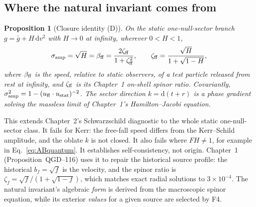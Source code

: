 \documentclass[11pt,a4paper]{article}
\newtheorem{proposition}[theorem]{Proposition}
\begin{document}
\subsection{Where the natural invariant comes from}
\begin{proposition}[Closure identity (D)]\label{prop:closure}
On the static one-null-sector branch $g=\bar g+H\,\mathrm dv^2$ with $H\to0$ at
infinity, wherever $0<H<1$,
\begin{equation}\label{eq:closure}
\sigma_{\rm amp}=\sqrt H=\beta_{\rm ff}=\frac{2\zeta_{\rm ff}}{1+\zeta_{\rm ff}^2},\qquad
\zeta_{\rm ff}=\frac{\sqrt H}{1+\sqrt{1-H}},
\end{equation}
where $\beta_{\rm ff}$ is the speed, relative to static observers, of a test
particle released from rest at infinity, and $\zeta_{\rm ff}$ is its Chapter~1
on-shell spinor ratio. Covariantly, $\sigma_{\rm amp}^2=1-(u_{\rm ff}\cdot u_{\rm stat})^{-2}$.
The sector direction $k=\mathrm d(t+r)$ is a phase gradient solving the massless
limit of Chapter~1's Hamilton--Jacobi equation.
\end{proposition}
\noindent This extends Chapter~2's Schwarzschild diagnostic to the whole static
one-null-sector class. It fails for Kerr: the free-fall speed differs from the
Kerr--Schild amplitude, and the oblate $k$ is not closed. It also fails where
$FH\neq1$, for example in Eq.~\eqref{eq:ABquantum}. It establishes
self-consistency, not origin. Chapter~1 (Proposition~QGD--116) uses it to repair the
historical source profile: the historical $b_f=\sqrt f$ is the velocity, and the spinor
ratio is $\zeta_f=\sqrt f/(1+\sqrt{1-f})$, which matches exact radial solutions to
$3\times10^{-4}$. The natural invariant's algebraic \emph{form} is
derived from the macroscopic spinor equation, while its exterior \emph{values}
for a given source are selected by F4.
\end{document}
